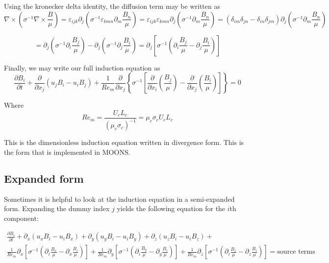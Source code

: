 \documentclass[11pt]{article}
\newcommand{\PD}{\partial}
\newcommand{\SII}{\sigma^{-1}}
\begin{document}
Using the kronecker delta identity, the diffusion term may be written as
\begin{equation}
	\nabla \times \left( \SII \nabla \times \frac{B}{\mu} \right)
	 = \varepsilon_{ijk} \PD_j \left( \SII \varepsilon_{kmn} \PD_m \frac{B_n}{\mu} \right)
	  = \varepsilon_{ijk} \varepsilon_{kmn} \PD_j \left( \SII \PD_m \frac{B_n}{\mu} \right)
	  = (\delta_{im}\delta_{jn} - \delta_{in}\delta_{jm}) \PD_j \left( \SII \PD_m \frac{B_n}{\mu} \right)
\end{equation}

\begin{equation}
	  = \PD_j \left( \SII \PD_i \frac{B_j}{\mu} \right) 
	  - \PD_j \left( \SII \PD_j \frac{B_i}{\mu} \right)
	  = \PD_j \left[ \SII \left( \PD_i \frac{B_j}{\mu} - \PD_j \frac{B_i}{\mu} \right) \right]
\end{equation}

Finally, we may write our full induction equation as
\begin{equation}
	\boxed{
	\frac{\PD B_i}{\PD t} 
	+ \frac{\PD}{\PD x_j} (u_j B_i - u_i B_j) 
	+ \frac{1}{Re_m}
	\frac{\PD}{\PD x_j} 
	\left\{ \SII 
	\left[ 
	\frac{\PD}{\PD x_i} 
	\left( \frac{B_j}{\mu} \right) - 
	\frac{\PD}{\PD x_j} 
	\left( \frac{B_i}{\mu} \right)
	\right]
	\right\} = 0
	}
\end{equation}

Where
\begin{equation}
	\boxed{
	Re_m = \frac{U_c L_c}{(\mu_c \sigma_c)^{-1}} = \mu_c \sigma_c U_c L_c
	}
\end{equation}

This is the dimensionless induction equation written in divergence form. This is the form that is implemented in MOONS.

\subsection{Expanded form}
Sometimes it is helpful to look at the induction equation in a semi-expanded form. Expanding the dummy index $j$ yields the following equation for the $i$th component:

\begin{multline}
	\frac{\PD B_i}{\PD t} + 
	\PD_x (u_x B_i - u_i B_x) + 
	\PD_y (u_y B_i - u_i B_y) + 
	\PD_z (u_z B_i - u_i B_z) + \\
	\frac{1}{Re_m}
	\PD_x \left[ \SII \left( \PD_i \frac{B_x}{\mu} - \PD_x \frac{B_i}{\mu} \right) \right] + 
	\frac{1}{Re_m}
	\PD_y \left[ \SII \left( \PD_i \frac{B_y}{\mu} - \PD_y \frac{B_i}{\mu} \right) \right] + 
	\frac{1}{Re_m}
	\PD_z \left[ \SII \left( \PD_i \frac{B_z}{\mu} - \PD_z \frac{B_i}{\mu} \right) \right]  = \text{source terms}
\end{multline}
\end{document}
